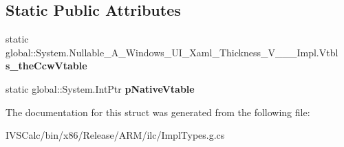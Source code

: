 \subsection*{Static Public Attributes}
\begin{DoxyCompactItemize}
\item 
\mbox{\label{struct_system_1_1_nullable___a___windows___u_i___xaml___thickness___v_______impl_1_1_vtbl_a8dd772abc41d421c5bfd8b2f59c47314}} 
static global\+::\+System.\+Nullable\+\_\+\+A\+\_\+\+Windows\+\_\+\+U\+I\+\_\+\+Xaml\+\_\+\+Thickness\+\_\+\+V\+\_\+\+\_\+\+\_\+\+Impl.\+Vtbl {\bfseries s\+\_\+the\+Ccw\+Vtable}
\item 
\mbox{\label{struct_system_1_1_nullable___a___windows___u_i___xaml___thickness___v_______impl_1_1_vtbl_ab6dae2c733fcac20425236aba03d7272}} 
static global\+::\+System.\+Int\+Ptr {\bfseries p\+Native\+Vtable}
\end{DoxyCompactItemize}


The documentation for this struct was generated from the following file\+:\begin{DoxyCompactItemize}
\item 
I\+V\+S\+Calc/bin/x86/\+Release/\+A\+R\+M/ilc/Impl\+Types.\+g.\+cs\end{DoxyCompactItemize}
